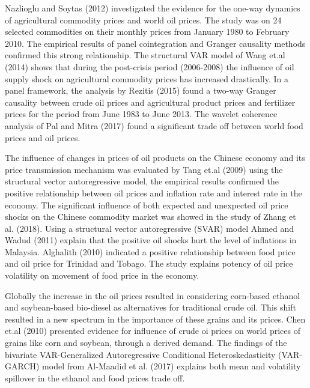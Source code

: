 \documentclass[a4paper,12pt]{article}
\begin{document}
Nazlioglu and Soytas (2012) investigated the evidence for the one-way dynamics of agricultural commodity prices and world oil prices. The study was on 24 selected commodities on their monthly prices from January 1980 to February 2010. The empirical results of panel cointegration and Granger causality methods confirmed this strong relationship. The structural VAR model of Wang et.al (2014) shows that during the post-crisis period (2006-2008) the influence of oil supply shock on agricultural commodity prices has increased drastically. In a panel framework, the analysis by Rezitis (2015) found a two-way Granger causality between crude oil prices and agricultural product prices and fertilizer prices for the period from June 1983 to June 2013. The wavelet coherence analysis of Pal and Mitra (2017) found a significant trade off between world food prices and oil prices.

The influence of changes in prices of oil products on the Chinese economy and its price transmission mechanism was evaluated by Tang et.al (2009) using the structural vector autoregressive model, the empirical results confirmed the positive relationship between oil prices and inflation rate and interest rate in the economy. The significant influence of both expected and unexpected oil price shocks on the Chinese commodity market was showed in the study of Zhang et al. (2018).
Using a structural vector autoregressive (SVAR) model Ahmed and Wadud (2011) explain that the positive oil shocks hurt the level of inflations in Malaysia. Alghalith (2010) indicated a positive relationship between food price and oil price for Trinidad and Tobago. The study explains potency of oil price volatility on movement of food price in the economy.

Globally the increase in the oil prices resulted in considering corn-based ethanol and soybean-based bio-diesel as alternatives for traditional crude oil. This shift resulted in a new spectrum in the importance of these grains and its prices. Chen et.al (2010) presented evidence for influence of crude oi prices on world prices of grains like corn and soybean, through a derived demand. The findings of the bivariate VAR-Generalized Autoregressive Conditional Heteroskedasticity (VAR-GARCH) model from Al-Maadid et al. (2017) explains both mean and volatility spillover in the ethanol and food prices trade off.
\end{document}
